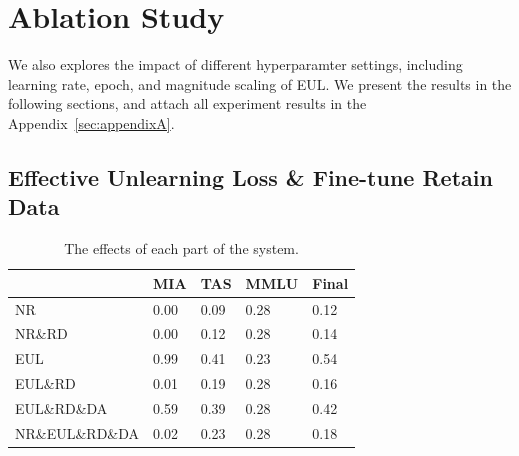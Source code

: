 \documentclass[11pt]{article}
\begin{document}


\section{Ablation Study}
\label{sec:Ablation}


We also explores the impact of different hyperparamter settings, including learning rate, epoch, and magnitude scaling of EUL. We present the results in the following sections, and attach all experiment results in the Appendix~\ref{sec:appendixA}.
\iffalse
\subsection{Effective Unlearning Loss \& Fine-tune Retain Data} 

\begin{table}[h]\footnotesize
  \centering
    \begin{tabular}{l|l|l|l|l}
    \hline
        ~ & MIA & TAS & MMLU & Final \\ \hline
        NR & 0.00 & 0.09 & 0.28 & 0.12 \\ \hline
        NR\&RD & 0.00 & 0.12 & 0.28 & 0.14 \\ \hline
        EUL & 0.99 & 0.41 & 0.23 & 0.54 \\ \hline
        EUL\&RD & 0.01 & 0.19 & 0.28 & 0.16 \\ \hline
        EUL\&RD\&DA & 0.59 & 0.39 & 0.28 & 0.42 \\ \hline
        NR\&EUL\&RD\&DA & 0.02 & 0.23 & 0.28 & 0.18 \\ \hline
    \end{tabular}
  \caption{The effects of each part of the system.}
  \label{tab:accents}
\end{table}
\end{document}
